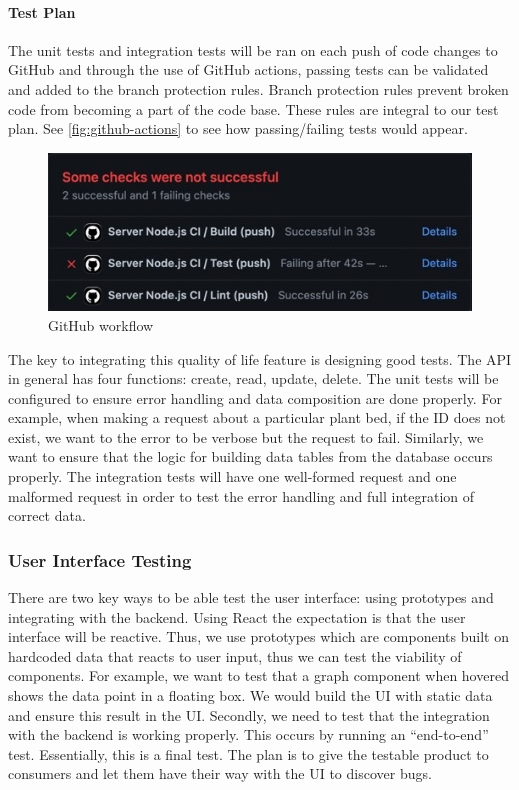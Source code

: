 \paragraph{Test Plan}
The unit tests and integration tests will be ran on each push of code changes to GitHub and through the use of GitHub actions, passing tests can be validated and added to the branch protection rules. Branch protection rules prevent broken code from becoming a part of the code base. These rules are integral to our test plan. See \autoref{fig:github-actions} to see how passing/failing tests would appear.

\begin{figure}[H]
    \caption{GitHub workflow}
    \label{fig:github-actions}
    \centering
    \includegraphics[width=\textwidth]{images/github.jpeg}
\end{figure}

The key to integrating this quality of life feature is designing good tests. The API in general has four functions: create, read, update, delete. The unit tests will be configured to ensure error handling and data composition are done properly. For example, when making a request about a particular plant bed, if the ID does not exist, we want to the error to be verbose but the request to fail. Similarly, we want to ensure that the logic for building data tables from the database occurs properly. The integration tests will have one well-formed request and one malformed request in order to test the error handling and full integration of correct data.

\subsubsection{User Interface Testing}
There are two key ways to be able test the user interface: using prototypes and integrating with the backend. Using React the expectation is that the user interface will be reactive. Thus, we use prototypes which are components built on hardcoded data that reacts to user input, thus we can test the viability of components. For example, we want to test that a graph component when hovered shows the data point in a floating box. We would build the UI with static data and ensure this result in the UI. Secondly, we need to test that the integration with the backend is working properly. This occurs by running an ``end-to-end'' test. Essentially, this is a final test. The plan is to give the testable product to consumers and let them have their way with the UI to discover bugs.

